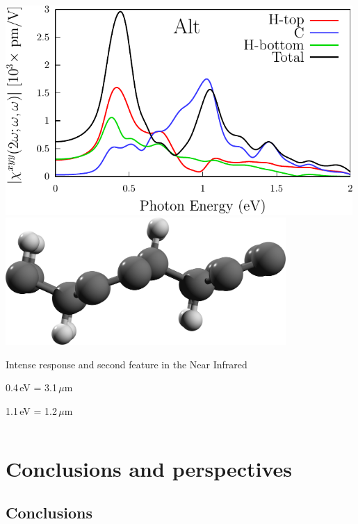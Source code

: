 \documentclass{beamer}
\begin{document}
\begin{frame}
\begin{columns}
\begin{center}
\vspace{-4mm}
\includegraphics[width=0.99\textwidth]{figs/plots/shg-lay-alt.pdf}
\vspace{0mm}
\includegraphics[width=0.8\textwidth]{figs/alt2.png}

Intense response and second feature in the Near Infrared

0.4\,eV = 3.1\,$\mu$m

1.1\,eV = 1.2\,$\mu$m

\end{center}


\end{columns}

\end{frame}


\section{Conclusions and perspectives} 



\subsection{Conclusions}
\end{document}

